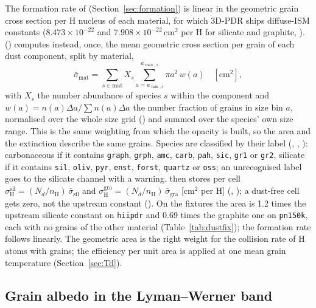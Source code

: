 The formation rate of \citet{CazauxTielens2002,CazauxTielens2004}
(Section~\ref{sec:formation}) is linear in the geometric grain cross section
per H nucleus of each material, for which 3D-PDR ships diffuse-ISM constants
($8.473\times10^{-22}$ and $7.908\times10^{-22}$\,cm$^2$ per H for silicate and
graphite, ). 
() computes instead, once, the mean
geometric cross section per grain of each dust component, split by material,
\begin{equation}
  \bar\sigma_{\mathrm{mat}} = \sum_{s\in\mathrm{mat}} X_s \sum_{a=a_{\min,s}}^{a_{\max,s}} \pi a^2\, w(a)
  \quad[\mathrm{cm^2}],
\end{equation}
with $X_s$ the number abundance of species $s$ within the component and
$w(a)=n(a)\Delta a/\sum n(a)\Delta a$ the number fraction of grains in size
bin $a$, normalised over the whole size grid
() and summed over the species' own size range.
This is the same weighting from which the opacity is built, so the area and
the extinction describe the same grains. Species are classified by their
label (, ,
): carbonaceous if it contains \texttt{graph},
\texttt{grph}, \texttt{amc}, \texttt{carb}, \texttt{pah}, \texttt{sic},
\texttt{gr1} or \texttt{gr2}, silicate if it contains \texttt{sil}, \texttt{oliv},
\texttt{pyr}, \texttt{enst}, \texttt{forst}, \texttt{quartz} or \texttt{oss}; an
unrecognised label goes to the silicate channel with a warning.
 then stores per cell
$\sigma^{\mathrm{sil}}_{\mathrm H}=(N_d/n_{\mathrm H})\,\bar\sigma_{\mathrm{sil}}$ and
$\sigma^{\mathrm{gra}}_{\mathrm H}=(N_d/n_{\mathrm H})\,\bar\sigma_{\mathrm{gra}}$
[cm$^2$ per H] (, ); a dust-free cell
gets zero, not the upstream constant (). On the fixtures the area
is 1.2 times the upstream silicate constant on \texttt{hiipdr} and 0.69 times
the graphite one on \texttt{pn150k}, each with no grains of the other material
(Table~\ref{tab:dustfix}); the formation rate follows linearly. The geometric
area is the right weight for the collision rate of H atoms with grains; the
efficiency per unit area is applied at one mean grain temperature
(Section~\ref{sec:Td}).

\subsection{Grain albedo in the Lyman--Werner band}

